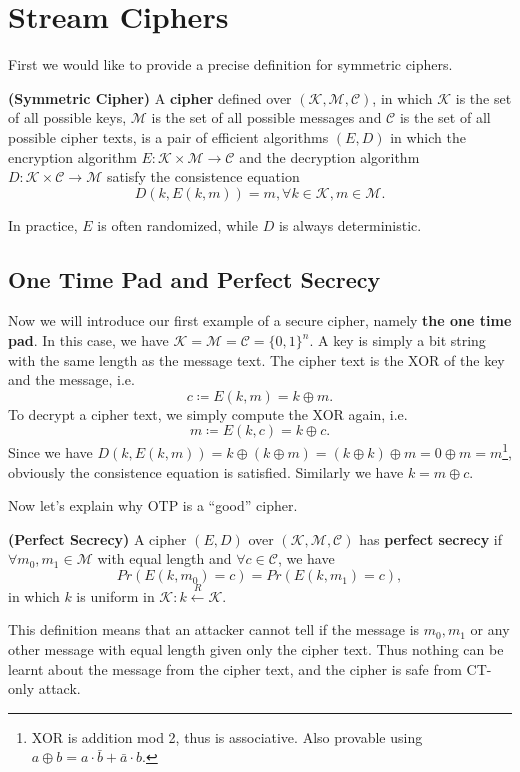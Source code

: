 \ifx\PREAMBLE\undefined


\fi
\chapter{Stream Ciphers}
First we would like to provide a precise definition for symmetric ciphers.
\begin{definition}\textbf{(Symmetric Cipher)}
A \textbf{cipher} defined over $(\mathcal{K,M,C})$, in which $\mathcal{K}$ is the set of all possible keys, $\mathcal{M}$ is the set of all possible messages and $\mathcal{C}$ is the set of all possible cipher texts, is a pair of efficient algorithms $(E,D)$ in which the encryption algorithm $E:\mathcal{K\times M}\rightarrow\mathcal{C}$ and the decryption algorithm $D:\mathcal{K\times C}\rightarrow \mathcal{M}$ satisfy the consistence equation
\begin{equation*}
D(k,E(k,m))=m, \forall k\in\mathcal{K},m\in\mathcal{M}.
\end{equation*}
\end{definition}
In practice, $E$ is often randomized, while $D$ is always deterministic.
\section{One Time Pad and Perfect Secrecy}
Now we will introduce our first example of a secure cipher, namely \textbf{the one time pad}. In this case, we have $\mathcal{K=M=C=}\{0,1\}^n$. A key is simply a bit string with the same length as the message text. The cipher text is the XOR of the key and the message, i.e.
\begin{equation*}
c\coloneqq E(k,m)= k\oplus m.
\end{equation*}
To decrypt a cipher text, we simply compute the XOR again, i.e.
\begin{equation*}
m\coloneqq E(k,c)= k\oplus c.
\end{equation*}
Since we have $D(k,E(k,m))=k\oplus(k\oplus m)=(k\oplus k)\oplus m=0\oplus m=m$\footnote{XOR is addition mod 2, thus is associative. Also provable using $a\oplus b=a\cdot\bar{b}+\bar{a}\cdot b$.}, obviously the consistence equation is satisfied. Similarly we have $k=m\oplus c$.

Now let's explain why OTP is a ``good'' cipher.
\begin{definition}\textbf{(Perfect Secrecy)}
A cipher $(E,D)$ over $(\mathcal{K}, \mathcal{M}, \mathcal{C})$ has \textbf{perfect secrecy} if $\forall m_0,m_1\in\mathcal{M}$ with equal length and $\forall c\in\mathcal{C}$, we have 
\begin{equation*}
Pr(E(k,m_0)=c)=Pr(E(k,m_1)=c),
\end{equation*}
in which $k$ is uniform in $\mathcal{K}: k\xleftarrow{R}\mathcal{K}.$
\end{definition}
This definition means that an attacker cannot tell if the message is $m_0, m_1$ or any other message with equal length given only the cipher text. Thus nothing can be learnt about the message from the cipher text, and the cipher is safe from CT-only attack. 

